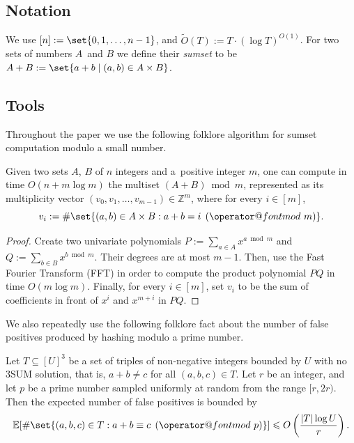 \documentclass{theoretics}
\makeatletter
\newcommand{\Ot}{\widetilde{O}}
\newcommand{\E}{\mathbb{E}}
\newcommand{\tpmod}[1]{\mkern 8mu({\operator@font mod}\mkern 6mu#1)}
\makeatother
\begin{document}
\subsection{Notation}

We use $[n] := \set{0, 1, \ldots, n-1}$, and $\Ot(T) := T \cdot (\log T)^{O(1)}$. For two sets of numbers $A$~and $B$ we define their \emph{sumset} to be $A + B := \set{a+b \mid (a, b) \in A \times B}$.

\subsection{Tools}
Throughout the paper we use the following folklore algorithm for sumset computation modulo a small number.

\begin{lemma}\label{lem:fft}
Given two sets $A$, $B$ of $n$ integers and a~positive integer $m$, one can compute in time $O(n + m \log m)$ the multiset $(A + B) \bmod m$, represented as its multiplicity vector $(v_0, v_1, \ldots, v_{m-1}) \in \mathbb{Z}^m$, where for every $i \in [m]$,
\[v_i := \#\set{(a, b) \in A \times B : a + b = i \tpmod{m}}.\]
\end{lemma}

\begin{proof}
Create two univariate polynomials $P := \sum_{a \in A}x^{a \bmod m}$ and $Q := \sum_{b \in B}x^{b \bmod m}$. Their degrees are at most $m - 1$. Then, use the Fast Fourier Transform (FFT) in order to compute the product polynomial $PQ$ in time $O(m \log m)$. Finally, for every $i \in [m]$, set $v_i$ to be the sum of coefficients in front of $x^i$ and $x^{m+i}$ in $PQ$.
\end{proof}

We also repeatedly use the following folklore fact about the number of false positives produced by hashing modulo a prime number.

\begin{lemma}\label{lem:false}
Let $T \subseteq [U]^3$ be a set of triples of non-negative integers bounded by $U$ with no 3SUM solution, that is, $a + b \neq c$ for all $(a,b,c) \in T$. Let $r$ be an integer, and let $p$ be a prime number sampled uniformly at random from the range $[r, 2r)$. Then the expected number of false positives is bounded by
\[\E[\#\set{(a,b,c) \in T : a + b \equiv c \tpmod{p}}] \leqslant O\left(\frac{|T|\log U}{r}\right).\]
\end{lemma}
\end{document}

